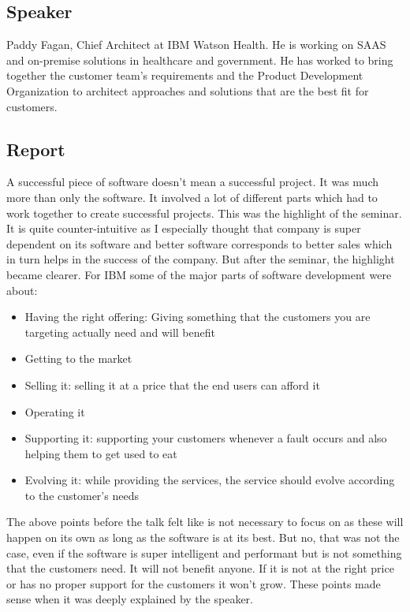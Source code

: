 \subsection{Speaker}

Paddy Fagan, Chief Architect at IBM Watson Health. He is working on SAAS and on-premise solutions in healthcare and government. He has worked to bring together the customer team's requirements and the Product Development Organization to architect approaches and solutions that are the best fit for customers.

\subsection{Report}

A successful piece of software doesn't mean a successful project. It was much more than only the software. It involved a lot of different parts which had to work together to create successful projects. This was the highlight of the seminar. It is quite counter-intuitive as I especially thought that company is super dependent on its software and better software corresponds to better sales which in turn helps in the success of the company. But after the seminar, the highlight became clearer. For IBM some of the major parts of software development were about:

\begin{itemize}
    \item Having the right offering: Giving something that the customers you are targeting actually need and will benefit
    \item Getting to the market
    \item Selling it: selling it at a price that the end users can afford it
    \item Operating it
    \item Supporting it: supporting your customers whenever a fault occurs and also helping them to get used to eat
    \item Evolving it: while providing the services, the service should evolve according to the customer's needs
\end{itemize}

The above points before the talk felt like is not necessary to focus on as these will happen on its own as long as the software is at its best. But no, that was not the case, even if the software is super intelligent and performant but is not something that the customers need. It will not benefit anyone. If it is not at the right price or has no proper support for the customers it won't grow. These points made sense when it was deeply explained by the speaker.

